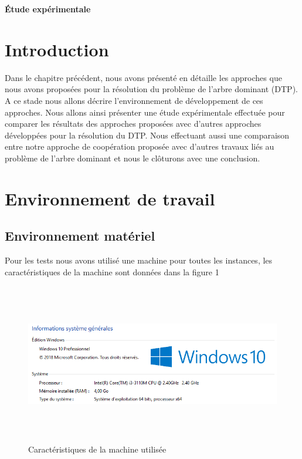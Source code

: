 


\cleardoublepage


\setcounter{chapter}{5}
\setcounter{section}{0}
\setcounter{figure}{0}

\begin{center}
	\Huge\textbf{Étude expérimentale}
\end{center}

\section{Introduction}
Dans le chapitre précédent, nous avons présenté en détaille les approches que nous avons proposées pour la résolution du problème de l’arbre dominant (DTP). A ce stade nous allons décrire l’environnement de développement de ces approches. Nous allons ainsi présenter une étude expérimentale effectuée pour comparer les résultats des approches proposées avec d’autres approches développées pour la résolution du DTP. Nous effectuant aussi une comparaison entre notre approche de coopération proposée  avec d’autres travaux liés au problème de l’arbre dominant et nous le clôturons avec une conclusion.


\section{Environnement de travail}

\subsection{Environnement matériel}
Pour les tests nous avons utilisé une machine pour toutes les instances, les caractéristiques de la machine sont données dans la figure 1

\begin{figure}[H]
	\centering
	\includegraphics[width=16cm,height=7cm]{Chap5/1.png}
	\caption{Caractéristiques de la machine utilisée}
	\label{fig:CMU}
\end{figure}

